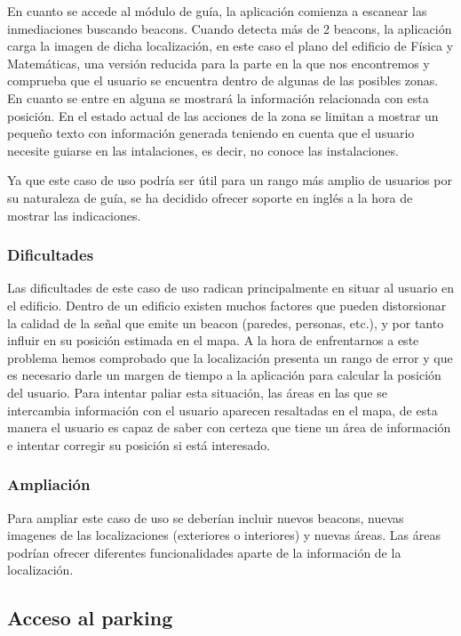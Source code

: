 En cuanto se accede al módulo de guía, la aplicación comienza a escanear las inmediaciones buscando beacons. Cuando detecta más de 2 beacons, la aplicación carga la imagen de dicha localización, en este caso el plano del edificio de Física y Matemáticas, una versión reducida para la parte en la que nos encontremos y comprueba que el usuario se encuentra dentro de algunas de las posibles zonas. En cuanto se entre en alguna se mostrará la información relacionada con esta posición. En el estado actual de \BulletPoint{} las acciones de la zona se limitan a mostrar un pequeño texto con información generada teniendo en cuenta que el usuario necesite guiarse en las intalaciones, es decir, no conoce las instalaciones.


Ya que este caso de uso podría ser útil para un rango más amplio de usuarios por su naturaleza de guía, se ha decidido ofrecer soporte en inglés a la hora de mostrar las indicaciones.

\subsubsection{Dificultades}

Las dificultades de este caso de uso radican principalmente en situar al usuario en el edificio. Dentro de un edificio existen muchos factores que pueden distorsionar la calidad de la señal que emite un beacon (paredes, personas, etc.), y por tanto influir en su posición estimada en el mapa. A la hora de enfrentarnos a este problema hemos comprobado que la localización presenta un rango de error y que es necesario darle un margen de tiempo a la aplicación para calcular la posición del usuario. Para intentar paliar esta situación, las áreas en las que se intercambia información con el usuario aparecen resaltadas en el mapa, de esta manera el usuario es capaz de saber con certeza que tiene un área de información e intentar corregir su posición si está interesado. 

\subsubsection{Ampliación}

Para ampliar este caso de uso se deberían incluir nuevos beacons, nuevas imagenes de las localizaciones (exteriores o interiores) y nuevas áreas. Las áreas podrían ofrecer diferentes funcionalidades aparte de la información de la localización.


\subsection{Acceso al parking}


